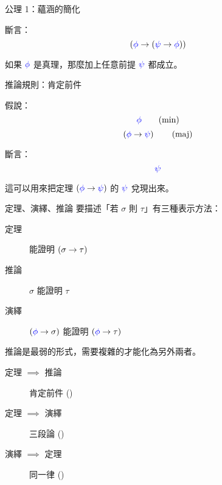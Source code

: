 \documentclass{Slideshow}
\begin{document}
\begin{frame}{公理 1：蘊涵的簡化}
    \begin{axiom}[\mmtarget{ax-1}]
        斷言：
        \[ \left( {\color{blue}\phi} \to \left( {\color{blue}\psi} \to {\color{blue}\phi} \right) \right) \]
    \end{axiom}

    如果 ${\color{blue}\phi}$ 是真理，那麼加上任意前提 ${\color{blue}\psi}$ 都成立。
\end{frame}


\begin{frame}{推論規則：肯定前件}
    \begin{axiom}[\mmtarget{ax-mp}]
        假說：
        \[ {\color{blue}\phi}        \tag{min} \]
        \[ \left( {\color{blue}\phi} \to {\color{blue}\psi} \right) \tag{maj} \]

        斷言：
        \[ {\color{blue}\psi} \]
    \end{axiom}

    這可以用來把定理 $\left( {\color{blue}\phi} \to {\color{blue}\psi} \right)$ 的 ${\color{blue}\psi}$ 兌現出來。
\end{frame}

\begin{frame}{定理、演繹、推論}
    要描述「若 $\sigma$ 則 $\tau$」有三種表示方法：
    \begin{description}
        \item[定理] 能證明 $\left( \sigma \to \tau \right)$
        \item[推論] $\sigma$ 能證明 $\tau$
        \item[演繹] $\left( {\color{blue}\phi} \to \sigma \right)$ 能證明 $\left( {\color{blue}\phi} \to \tau \right)$
    \end{description}

    推論是最弱的形式，需要複雜的才能化為另外兩者。
    \begin{description}
        \item[定理 $\implies$ 推論] 肯定前件 ()
        \item[定理 $\implies$ 演繹] 三段論 ()
        \item[演繹 $\implies$ 定理] 同一律 ()
    \end{description}
\end{frame}
\end{document}
